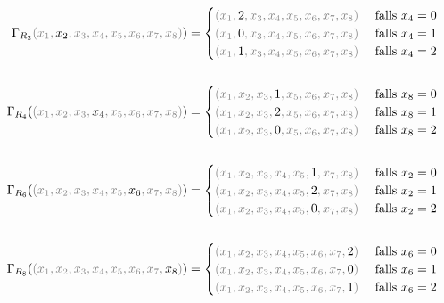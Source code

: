 \documentclass[12pt,a4paper, usenames, dvipsnames]{article}
\theoremstyle{mystyle}
\theoremstyle{definition}
\begin{document}
\begin{align*}
\Gamma_{R_2}\textcolor{gray}{(x_1, \textcolor{black}{x_2}, x_3, x_4, x_5, x_6, x_7, x_8  )})= \begin{cases}
\textcolor{gray}{(x_1, \textcolor{black}{2}, x_3, x_4, x_5, x_6, x_7, x_8  )} & \ \text{falls } x_4 = 0 \\ 
\textcolor{gray}{(x_1, \textcolor{black}{0}, x_3, x_4, x_5, x_6, x_7, x_8  )} & \ \text{falls } x_4 = 1 \\
\textcolor{gray}{(x_1, \textcolor{black}{1}, x_3, x_4, x_5, x_6, x_7, x_8  )} & \ \text{falls } x_4 = 2 
\end{cases} \\ 
\\
\Gamma_{R_4}(\textcolor{gray}{(x_1, x_2, x_3, \textcolor{black}{x_4}, x_5, x_6, x_7, x_8  )})= \begin{cases}
\textcolor{gray}{(x_1, x_2, x_3, \textcolor{black}{1}, x_5, x_6, x_7, x_8  )} & \ \text{falls } x_8 = 0 \\ 
\textcolor{gray}{(x_1, x_2, x_3, \textcolor{black}{2}, x_5, x_6, x_7, x_8  )} & \ \text{falls } x_8 = 1 \\
\textcolor{gray}{(x_1, x_2, x_3, \textcolor{black}{0}, x_5, x_6, x_7, x_8  )} & \ \text{falls } x_8 = 2 
\end{cases} \\
\\
\Gamma_{R_6}(\textcolor{gray}{(x_1, x_2, x_3, x_4, x_5, \textcolor{black}{x_6}, x_7, x_8  )})= \begin{cases}
\textcolor{gray}{(x_1, x_2, x_3, x_4, x_5, \textcolor{black}{1}, x_7, x_8  )} & \ \text{falls } x_2 = 0 \\ 
\textcolor{gray}{(x_1, x_2, x_3, x_4, x_5, \textcolor{black}{2}, x_7, x_8  )} & \ \text{falls } x_2 = 1 \\
\textcolor{gray}{(x_1, x_2, x_3, x_4, x_5, \textcolor{black}{0}, x_7, x_8  )} & \ \text{falls } x_2 = 2 
\end{cases} \\
\\
\Gamma_{R_8}(\textcolor{gray}{(x_1, x_2, x_3, x_4, x_5, x_6, x_7, \textcolor{black}{x_8})})= \begin{cases}
\textcolor{gray}{(x_1, x_2, x_3, x_4, x_5, x_6, x_7, \textcolor{black}{2})} & \ \text{falls } x_6 = 0 \\ 
\textcolor{gray}{(x_1, x_2, x_3, x_4, x_5, x_6, x_7, \textcolor{black}{0})} & \ \text{falls } x_6 = 1 \\
\textcolor{gray}{(x_1, x_2, x_3, x_4, x_5, x_6, x_7, \textcolor{black}{1})} & \ \text{falls } x_6 = 2 
\end{cases}
\end{align*}
\end{document}

